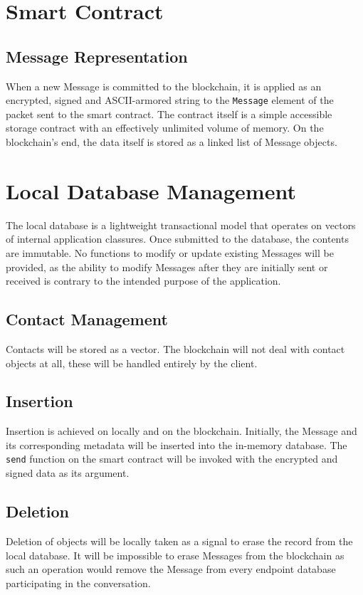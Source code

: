 \documentclass[]{article}
\begin{document}
\section{Smart Contract}
\subsection{Message Representation}
When a new Message is committed to the blockchain, it is applied as an encrypted, signed and ASCII-armored string to the \verb!Message! element of the packet sent to the smart contract. The contract itself is a simple accessible storage contract with an effectively unlimited volume of memory. On the blockchain's end, the data itself is stored as a linked list of Message objects.

\section{Local Database Management}
The local database is a lightweight transactional model that operates on vectors of internal application classures. Once submitted to the database, the contents are immutable. No functions to modify or update existing Messages will be provided, as the ability to modify Messages after they are initially sent or received is contrary to the intended purpose of the application.
\subsection{Contact Management}
Contacts will be stored as a vector. The blockchain will not deal with contact objects at all, these will be handled entirely by the client.
\subsection{Insertion}
Insertion is achieved on locally and on the blockchain. Initially, the Message and its corresponding metadata will be inserted into the in-memory database. The \verb!send! function on the smart contract will be invoked with the encrypted and signed data as its argument. 
\subsection{Deletion}
Deletion of objects will be locally taken as a signal to erase the record from the local database. It will be impossible to erase Messages from the blockchain as such an operation would remove the Message from every endpoint database participating in the conversation.
\end{document}

